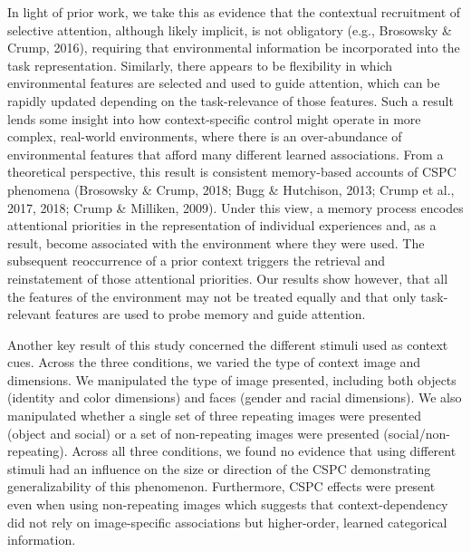 \documentclass[english,,man,floatsintext]{apa6}
\begin{document}
In light of prior work, we take this as evidence that the contextual recruitment of selective attention, although likely implicit, is not obligatory (e.g., Brosowsky \& Crump, 2016), requiring that environmental information be incorporated into the task representation. Similarly, there appears to be flexibility in which environmental features are selected and used to guide attention, which can be rapidly updated depending on the task-relevance of those features. Such a result lends some insight into how context-specific control might operate in more complex, real-world environments, where there is an over-abundance of environmental features that afford many different learned associations. From a theoretical perspective, this result is consistent memory-based accounts of CSPC phenomena (Brosowsky \& Crump, 2018; Bugg \& Hutchison, 2013; Crump et al., 2017, 2018; Crump \& Milliken, 2009). Under this view, a memory process encodes attentional priorities in the representation of individual experiences and, as a result, become associated with the environment where they were used. The subsequent reoccurrence of a prior context triggers the retrieval and reinstatement of those attentional priorities. Our results show however, that all the features of the environment may not be treated equally and that only task-relevant features are used to probe memory and guide attention.

Another key result of this study concerned the different stimuli used as context cues. Across the three conditions, we varied the type of context image and dimensions. We manipulated the type of image presented, including both objects (identity and color dimensions) and faces (gender and racial dimensions). We also manipulated whether a single set of three repeating images were presented (object and social) or a set of non-repeating images were presented (social/non-repeating). Across all three conditions, we found no evidence that using different stimuli had an influence on the size or direction of the CSPC demonstrating generalizability of this phenomenon. Furthermore, CSPC effects were present even when using non-repeating images which suggests that context-dependency did not rely on image-specific associations but higher-order, learned categorical information.
\end{document}
